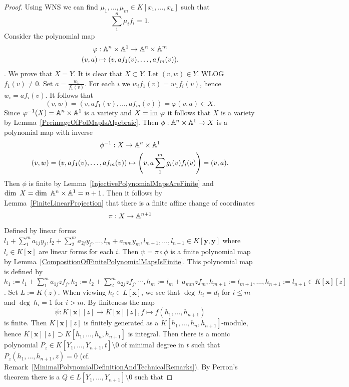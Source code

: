     \begin{proof}
        Using WNS we can find $\mu_1,\dots,\mu_m\in K[x_1,\dots,x_n]$ such that 
        $$\sum_1^n\mu_if_i= 1.$$
    Consider the polynomial map 
    \begin{gather*}
        \varphi : \mathbb{A}^n \times \mathbb{A}^1 \rightarrow \mathbb{A}^n\times \mathbb{A}^m\\
        (v,a) \mapsto (v , af_1(v),\dots, af_m(v)). 
    \end{gather*}
    . We prove that $X=Y$.
    It is clear that $X\subset Y$. Let $(v,w)\in Y$. WLOG $f_1(v)\neq 0$. Set $a = \frac{w_1}{f_1(v)}$. For each $i$ we $w_if_1(v)=w_1f_i(v)$, hence $w_i=af_i(v)$. It follows that 
    $$(v,w)=(v,a f_1(v),\dots,af_m(v)) = \varphi(v,a)\in X.$$
    Since $\varphi^{-1}(X)= \mathbb{A}^n\times\mathbb{A}^1$ is a variety and $X=\mathrm{im}\ \varphi$ it follows that $X$ is a variety by Lemma~\ref{PreimageOfPolMapIsAlgebraic}. Then $\phi : \mathbb{A}^n\times \mathbb{A}^1\rightarrow X$ is a polynomial map with inverse 
    \begin{gather*}
        \phi^{-1} : X \rightarrow \mathbb{A}^n\times \mathbb{A}^1\\
        (v,w)=(v,af_1(v),\dots,af_m(v)) \mapsto \left(v,a\sum_1^m g_i(v)f_i(v)\right)=(v,a).
    \end{gather*}
    Then $\phi$ is finite by Lemma~\ref{InjectivePolynomialMapsAreFinite} and $\dim \ X = \dim\ \mathbb{A}^n\times \mathbb{A}^1 = n+1$. Then it follows by Lemma~\ref{FiniteLinearProjection} that there is a finite affine change of coordinates
    $$\pi : X\rightarrow \mathbb{A}^{n+1}$$
    Defined by linear forms $l_1+\sum_1^m a_{1j}y_j,l_2+\sum_2^m a_{2j}y_j,\dots, l_m+a_{mm}y_m,l_{m+1},\dots,l_{n+1}\in K[\mathbf{y},\mathbf{y}]$ where $l_i\in K[\mathbf{x}]$ are linear forms for each $i$. Then $\psi = \pi \circ \phi$ is a finite polynomial map by Lemma~\ref{CompositionOfFinitePolynomialMapsIsFinite}. This polynomial map is defined by $h_1 := l_1+\sum_1^m a_{1j}zf_j, h_2:= l_2+\sum_2^m a_{2j}zf_j,\cdots, h_m:=l_m+a_{mm}zf_m,h_{m+1}:=l_{m+1},\dots,h_{n+1}:= l_{n+1}\in K[\mathbf{x}][z]$. Set $L:= K(z)$. When viewing $h_i\in L[\mathbf{x}]$, we see that $\deg\ h_i = d_i$ for $i\leq m$ and $\deg\ h_i = 1$ for $i>m$. By finiteness the map 
    $$\widetilde{\psi} : K[\mathbf{x}][z]\rightarrow K[\mathbf{x}][z], f\mapsto f(h_1,\dots,h_{n+1})$$
    is finite. Then $K[\mathbf{x}][z]$ is finitely generated as a $K[h_1,\dots,h_n,h_{n+1}]$-module, hence $K[\mathbf{x}][z]\supset K[h_1,\dots,h_n,h_{n+1}]$ is integral. Then there is a monic polynomial $P_z\in K[Y_1,\dots,Y_{n+1},t]\setminus 0$ of minimal degree in $t$ such that 
    $P_z(h_1,\dots,h_{n+1},z)=0$ (cf. Remark~\ref{MinimalPolynomialDefinitionAndTechnicalRemarks}). By Perron's theorem there is a $Q\in L[Y_1,\dots,Y_{n+1}]\setminus 0$ such that 

\end{proof}
